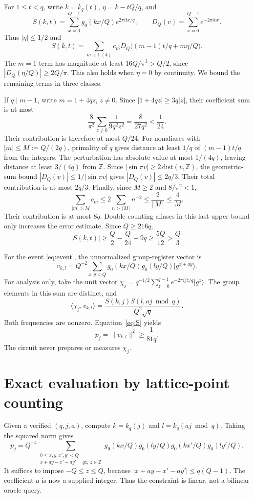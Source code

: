 \documentclass[11pt,reqno]{amsart}
\numberwithin{equation}{section}
\theoremstyle{definition}
\theoremstyle{remark}
\newcommand{\ket}[1]{\lvert#1\rangle}
\newcommand{\Z}{\mathbb Z}
\begin{document}
For $1\le t<q$, write $k=k_q(t)$, $\eta=k-tQ/q$, and
\[
 S(k,t)=\sum_{x=0}^{Q-1}g_0(kx/Q)e^{2\pi itx/q},\qquad
 D_Q(v)=\sum_{x=0}^{Q-1}e^{-2\pi ivx}.
\]
Thus $|\eta|\le1/2$ and
\[
 S(k,t)=\sum_{m\equiv1\ (4)}c_m
 D_Q\bigl((m-1)t/q+m\eta/Q\bigr).
\]
The $m=1$ term has magnitude at least
$16Q/\pi^3>Q/2$, since $|D_Q(\eta/Q)|\ge2Q/\pi$.
This also holds when $\eta=0$ by continuity.
We bound the remaining terms in three classes.

If $q\mid m-1$, write $m=1+4qz$, $z\ne0$.
Since $|1+4qz|\ge3q|z|$, their coefficient sum is at most
\[
 \frac8{\pi^2}\sum_{z\ne0}\frac1{9q^2z^2}
 =\frac8{27q^2}<\frac1{24}.
\]
Their contribution is therefore at most $Q/24$.
For nonaliases with $|m|\le M:=Q/(2q)$, primality of $q$ gives
distance at least $1/q$ of $(m-1)t/q$ from the integers. The perturbation
has absolute value at most $1/(4q)$, leaving distance at least
$3/(4q)$ from $\mathbb Z$. Since
$|\sin\pi v|\ge2\,\mathrm{dist}(v,\mathbb Z)$, the geometric-sum
bound $|D_Q(v)|\le1/|\sin\pi v|$ gives $|D_Q(v)|\le2q/3$.
Their total contribution is at most $2q/3$.
Finally, since $M\ge2$ and $8/\pi^2<1$,
\[
 \sum_{|m|>M}c_m\le2\sum_{n>\lfloor M\rfloor}n^{-2}
 \le\frac2{\lfloor M\rfloor}\le\frac4M.
\]
Their contribution is at most $8q$. Double counting aliases in this
last upper bound only increases the error estimate. Since $Q\ge216q$,
\begin{equation}\label{eq:S}
 |S(k,t)|\ge\frac Q2-\frac Q{24}-9q
 \ge\frac{5Q}{12}>\frac Q3.
\end{equation}

For the event \eqref{eq:event}, the unnormalized group-register vector is
\[
 v_{k,l}=Q^{-2}\sum_{x,y<Q}g_0(kx/Q)g_0(ly/Q)\ket{g^{x+ay}}.
\]
For analysis only, take the unit vector
$\chi_j=q^{-1/2}\sum_{z=0}^{q-1}e^{-2\pi ijz/q}\ket{g^z}$.
The group elements in this sum are distinct, and
\[
 \langle\chi_j,v_{k,l}\rangle
 =\frac{S(k,j)S(l,aj\bmod q)}{Q^2\sqrt q}.
\]
Both frequencies are nonzero. Equation~\eqref{eq:S} yields
\begin{equation}\label{eq:pjlower}
 p_j=\|v_{k,l}\|^2\ge\frac1{81q}.
\end{equation}
The circuit never prepares or measures $\chi_j$.

\section{Exact evaluation by lattice-point counting}
Given a verified $(q,j,a)$, compute $k=k_q(j)$ and $l=k_q(aj\bmod q)$.
Taking the squared norm gives
\begin{equation}\label{eq:count}
 p_j=Q^{-4}\!\sum_{\substack{0\le x,y,x',y'<Q\\
 x+ay-x'-ay'=qz,\ z\in\Z}}
 g_0(kx/Q)g_0(ly/Q)
 \overline{g_0(kx'/Q)g_0(ly'/Q)}.
\end{equation}
It suffices to impose $-Q\le z\le Q$, because
$|x+ay-x'-ay'|\le q(Q-1)$. The coefficient $a$ is now a supplied
integer. Thus the constraint is linear, not a bilinear oracle query.
\end{document}
